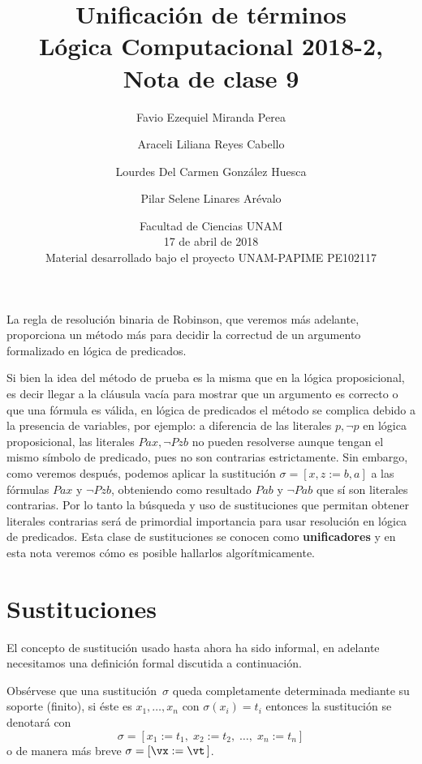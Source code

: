 \documentclass[11pt,letterpaper]{article}
\title{Unificaci\'on de t\'erminos \\
L\'ogica Computacional 2018-2, Nota de clase 9}
\author{Favio Ezequiel Miranda Perea\and Araceli Liliana Reyes Cabello\and
Lourdes Del Carmen Gonz\'alez Huesca \and Pilar Selene Linares Ar\'evalo}
\date{Facultad de Ciencias UNAM \\17 de abril de 2018 \\
Material desarrollado bajo el proyecto UNAM-PAPIME PE102117}
\begin{document}
\maketitle
La regla de resolución binaria de Robinson, que veremos más adelante, 
proporciona un método más para decidir la correctud de un argumento formalizado 
en lógica de predicados. 

Si bien la idea del método de prueba es la misma que en la lógica 
proposicional, es decir llegar a la cláusula vacía para mostrar que un argumento 
es correcto o que una fórmula es válida, en lógica de predicados el método se 
complica debido a la presencia de variables, por ejemplo: a diferencia de las 
literales $p,\neg p$ en lógica proposicional, las literales $Pax, \neg Pzb$ no 
pueden resolverse aunque tengan el mismo símbolo de predicado, pues no son 
contrarias estrictamente. 
Sin embargo, como veremos después,  podemos aplicar la sustitución $\sigma=[x,z:=b,a]$ a las fórmulas $ Pax$ y $\neg Pzb$, 
obteniendo como resultado $Pab$ y $\neg Pab$ que sí son literales contrarias. 
Por lo tanto la búsqueda y uso de sustituciones que permitan obtener literales 
contrarias será de primordial importancia para usar resolución en lógica de 
predicados. Esta clase de sustituciones se conocen como \textbf{unificadores} y 
en esta nota veremos c\'omo es posible hallarlos algorítmicamente.


\section{Sustituciones}

El concepto de sustitución usado hasta ahora ha sido informal, en adelante 
necesitamos una definición formal discutida a continuación.

Obsérvese que una sustitución~$\sigma$ queda completamente determinada mediante 
su soporte (finito), si éste es $x_1,\ldots,x_n$ con $\sigma(x_i)=t_i$ entonces
la sustitución se denotará con
$$ \sigma = [x_1:= t_1,\;x_2:=t_2,\;\ldots,\;x_n:=t_n] $$
o de manera más breve $\sigma=[\vx:=\vt\,]$. \\
\end{document}
